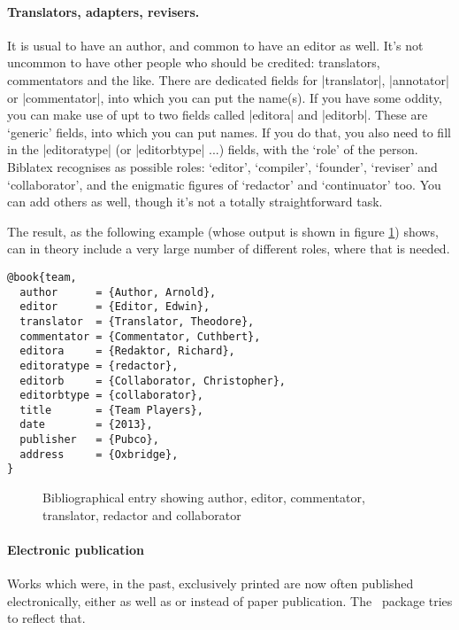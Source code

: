 \paragraph{Translators, adapters, revisers.} It is usual to have an
author, and common to have an editor as well. It's not uncommon to
have other people who should be credited: translators, commentators
and the like. There are dedicated fields for |translator|, |annotator|
or |commentator|, into which you can put the name(s). If you have some
oddity, you can make use of upt to two fields called |editora| and
|editorb|. These are `generic' fields, into which you can put
names. If you do that, you also need to fill in the |editoratype| (or
|editorbtype| ...) fields, with the `role' of the person. Biblatex
recognises as possible roles: `editor', `compiler', `founder',
`reviser' and `collaborator', and the enigmatic figures of `redactor'
and `continuator' too. You can add others as well, though it's not a
totally straightforward task.

The result, as the following example (whose output is shown in figure
\ref{redactors}) shows, can in theory include a very large number of
different roles, where that is needed.
\begin{Verbatim}
@book{team,
  author      = {Author, Arnold},
  editor      = {Editor, Edwin},
  translator  = {Translator, Theodore},
  commentator = {Commentator, Cuthbert},
  editora     = {Redaktor, Richard},
  editoratype = {redactor},
  editorb     = {Collaborator, Christopher},
  editorbtype = {collaborator},
  title       = {Team Players},
  date        = {2013},
  publisher   = {Pubco},
  address     = {Oxbridge},
}
\end{Verbatim}

\begin{figure}
\caption{Bibliographical entry showing author, editor, commentator, translator, redactor and collaborator\label{redactors}}
\end{figure}

\paragraph{Electronic publication} Works which were, in the past,
exclusively printed are now often published electronically, either as
well as or instead of paper publication. The \biblatex\ package tries
to reflect that.


